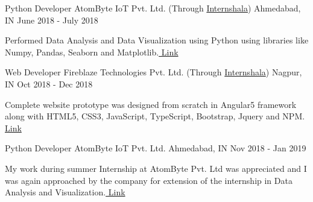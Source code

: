 

\begin{cventries}

  \cventry
    {Python Developer} %
    {AtomByte IoT Pvt. Ltd. (Through \href{https://internshala.com/student/certificate/12602917/740324C7-EA90-B04C-96B5-4E1AFAE4F912}{Internshala})} %
    {Ahmedabad, IN} %
    {June 2018 - July 2018} %
    {
      \begin{cvitems} %
        \item {Performed Data Analysis and Data Visualization using Python using libraries like Numpy, Pandas, Seaborn and Matplotlib.\href{https://drive.google.com/open?id=1kaBHedNjnz_T0Ts70zr5loajDxrinrSu}{ Link}
        }
      \end{cvitems}
    }

  \cventry
    {Web Developer} %
    {Fireblaze Technologies Pvt. Ltd. (Through \href{https://internshala.com/student/certificate/15933363/8E7554D8-A49C-3BB8-E966-C92DEBD87488}{Internshala})} %
    {Nagpur, IN} %
    {Oct 2018 - Dec 2018} %
    {
      \begin{cvitems} %
        \item {Complete website prototype was designed from scratch in Angular5 framework along with HTML5, CSS3, JavaScript, TypeScript, Bootstrap, Jquery and NPM. \href{https://drive.google.com/open?id=0B2fmTyn8UfxGV0xvd0NORWtXV1YzODBwdWh4ZzJkbHNXWmpv}{  Link}}
      \end{cvitems}
    }

   \cventry
    {Python Developer} %
    {AtomByte IoT Pvt. Ltd.} %
    {Ahmedabad, IN} %
    {Nov 2018 - Jan 2019} %
    {
      \begin{cvitems} %
        \item {My work during summer Internship at AtomByte Pvt. Ltd was appreciated and I was again approached by the company for extension of the internship in Data Analysis and Visualization.\href{https://drive.google.com/open?id=16eaM3vPx9-oip737oujlmcCkrA6x-Yv5}{ Link}
        }
      \end{cvitems}
    }


\end{cventries}
